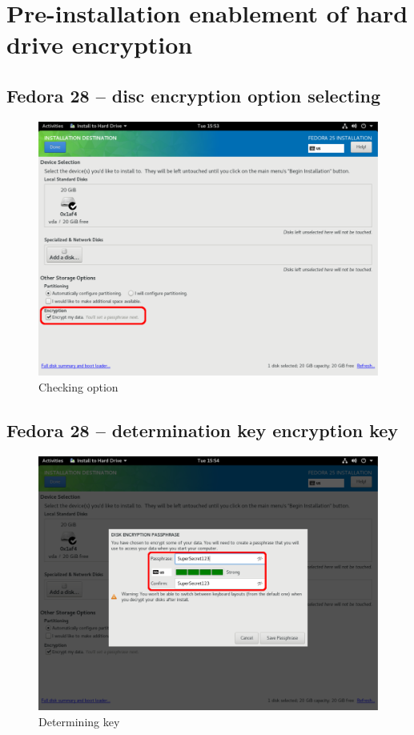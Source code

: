 \chapter{Pre-installation enablement of hard drive encryption}
\label{luksinstall}

\section{Fedora 28 -- disc encryption option selecting }

\begin{figure}[h]
    \centering
    \includegraphics[scale=0.42]{figures/FedoraInstall1.pdf}
    \caption{Checking option}
\end{figure}

\newpage

\section{Fedora 28 -- determination key encryption key }

\begin{figure}[h]
    \centering
    \includegraphics[scale=0.42]{figures/FedoraInstall2.pdf}
    \caption{Determining key}
\end{figure}
